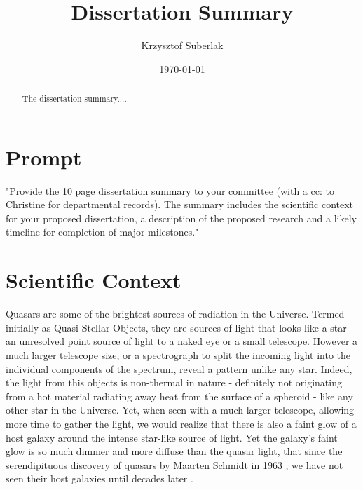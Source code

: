 \documentclass[modern]{aastex62}
\begin{document}
\title{Dissertation Summary}
\author{Krzysztof Suberlak}

\date{ \today
}

\begin{abstract}
The dissertation summary.... 
\end{abstract}

\section*{Prompt}
"Provide the 10 page dissertation summary to your committee (with a cc: to Christine for
departmental records). The summary includes the scientific context for your proposed
dissertation, a description of the proposed research and a likely timeline for completion of
major milestones."

\section{Scientific Context}

Quasars are some of the brightest sources of radiation in the Universe.  Termed initially as Quasi-Stellar Objects, they are sources of light that looks like a star - an unresolved point source of light to a naked eye or a small telescope. However a much larger telescope size, or a spectrograph to split the incoming light into the individual components of the spectrum, reveal a pattern unlike any star. Indeed, the light from this objects is non-thermal in nature - definitely not originating from a hot material radiating away heat from the surface of a spheroid - like any other star in the Universe. Yet, when seen with a much larger telescope, allowing more time to gather the light, we would realize that there is also a faint glow of a host galaxy around the intense star-like source of light.  Yet the galaxy's faint glow is so much dimmer and more diffuse than the quasar light, that since the serendipituous discovery of quasars by Maarten Schmidt in 1963 \citep{schmidt1963, richards2009a}, we have not seen their host galaxies until decades later \citep{hooper1997, boyce1999, lehnert1999}.
\end{document}
